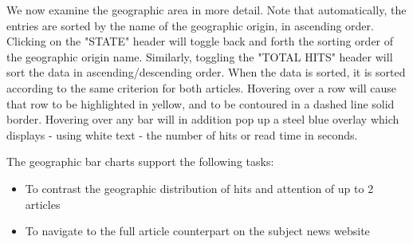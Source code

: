 \documentclass[12pt]{article}
\begin{document}
\noindent We now examine the geographic area in more detail. Note that automatically, the entries are sorted by the name of the geographic origin, in ascending order. Clicking on the "STATE" header will toggle back and forth the sorting order of the geographic origin name. Similarly, toggling the "TOTAL HITS" header will sort the data in ascending/descending order. When the data is sorted, it is sorted according to the same criterion for both articles. Hovering over a row will cause that row to be highlighted in yellow, and to be contoured in a dashed line solid border. Hovering over any bar will in addition pop up a steel blue overlay which displays - using white text - the number of hits or read time in seconds.  

The geographic bar charts support the following tasks:
\begin{itemize}
\item To contrast the geographic distribution of hits and attention of up to 2 articles
\item To navigate to the full article counterpart on the subject news website
\end{itemize}

\vfill
\end{document}
